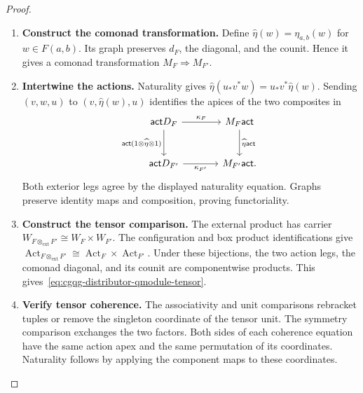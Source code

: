 \documentclass[oneside]{article}
\newcommand{\act}{\mathsf{act}}
\newcommand{\extprod}{\mathbin{\otimes_{\mathrm{ext}}}}
\theoremstyle{plain}
\theoremstyle{definition}
\theoremstyle{remark}
\begin{document}
\begin{proof}
    \leavevmode
    \begin{enumerate}[beginpenalty=10000]
        \item \textbf{Construct the comonad transformation.}
        Define \(\widehat\eta(w)=\eta_{a,b}(w)\) for \(w\in F(a,b)\).
        Its graph preserves \(d_F\), the diagonal, and the counit.
        Hence it gives a comonad transformation \(M_F\Rightarrow M_{F'}\).

        \item \textbf{Intertwine the actions.}
        Naturality gives
        \(\widehat\eta(u_*v^*w)=u_*v^*\widehat\eta(w)\).
        Sending \((v,w,u)\) to \((v,\widehat\eta(w),u)\) identifies
        the apices of the two composites in
        \[
        \begin{tikzcd}[column sep=large,row sep=large]
        \act D_F\arrow[r,"\kappa_F"]
          \arrow[d,"{\act(1\otimes\widehat\eta\otimes1)}"']
          &M_F\act\arrow[d,"\widehat\eta \act"]\\
        \act D_{F'}\arrow[r,"\kappa_{F'}"']&M_{F'}\act.
        \end{tikzcd}
        \]
        Both exterior legs agree by the displayed naturality equation.
        Graphs preserve identity maps and composition, proving functoriality.

        \item \textbf{Construct the tensor comparison.}
        The external product has carrier
        \(W_{F\extprod F'}\cong W_F\times W_{F'}\).
        The configuration and box product identifications give
        \(\operatorname{Act}_{F\extprod F'}
          \cong\operatorname{Act}_F\times\operatorname{Act}_{F'}\).
        Under these bijections, the two action legs, the comonad
        diagonal, and its counit are componentwise products.
        This gives~\eqref{eq:cgqg-distributor-qmodule-tensor}.

        \item \textbf{Verify tensor coherence.}
        The associativity and unit comparisons rebracket tuples or
        remove the singleton coordinate of the tensor unit. The symmetry
        comparison exchanges the two factors. Both sides of each
        coherence equation have the same action apex and the same
        permutation of its coordinates. Naturality follows by applying
        the component maps to these coordinates. \qedhere
    \end{enumerate}
\end{proof}
\end{document}
